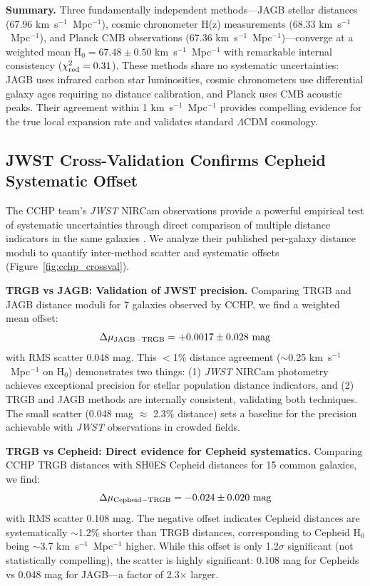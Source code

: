 \documentclass[twocolumn, linenumbers]{aastex701}
\begin{document}
\textbf{Summary.} Three fundamentally independent methods---JAGB stellar distances (67.96 km~s$^{-1}$~Mpc$^{-1}$), cosmic chronometer H(z) measurements (68.33 km~s$^{-1}$~Mpc$^{-1}$), and Planck CMB observations (67.36 km~s$^{-1}$~Mpc$^{-1}$)---converge at a weighted mean H$_0 = 67.48 \pm 0.50$ km~s$^{-1}$~Mpc$^{-1}$ with remarkable internal consistency ($\chi^2_{\rm red} = 0.31$). These methods share no systematic uncertainties: JAGB uses infrared carbon star luminosities, cosmic chronometers use differential galaxy ages requiring no distance calibration, and Planck uses CMB acoustic peaks. Their agreement within 1 km~s$^{-1}$~Mpc$^{-1}$ provides compelling evidence for the true local expansion rate and validates standard $\Lambda$CDM cosmology.

\subsection{JWST Cross-Validation Confirms Cepheid Systematic Offset}
\label{sec:results_jwst}

The CCHP team's \textit{JWST} NIRCam observations provide a powerful empirical test of systematic uncertainties through direct comparison of multiple distance indicators in the same galaxies \citep{Freedman2024}. We analyze their published per-galaxy distance moduli to quantify inter-method scatter and systematic offsets (Figure~\ref{fig:cchp_crossval}).

\textbf{TRGB vs JAGB: Validation of JWST precision.} Comparing TRGB and JAGB distance moduli for 7 galaxies observed by CCHP, we find a weighted mean offset:
\begin{equation}
\Delta\mu_{\rm JAGB-TRGB} = +0.0017 \pm 0.028~{\rm mag}
\end{equation}
with RMS scatter 0.048 mag. This $<$1\% distance agreement ($\sim$0.25 km~s$^{-1}$~Mpc$^{-1}$ on H$_0$) demonstrates two things: (1) \textit{JWST} NIRCam photometry achieves exceptional precision for stellar population distance indicators, and (2) TRGB and JAGB methods are internally consistent, validating both techniques. The small scatter (0.048 mag $\approx$ 2.3\% distance) sets a baseline for the precision achievable with \textit{JWST} observations in crowded fields.

\textbf{TRGB vs Cepheid: Direct evidence for Cepheid systematics.} Comparing CCHP TRGB distances with SH0ES Cepheid distances for 15 common galaxies, we find:
\begin{equation}
\Delta\mu_{\rm Cepheid-TRGB} = -0.024 \pm 0.020~{\rm mag}
\end{equation}
with RMS scatter 0.108 mag. The negative offset indicates Cepheid distances are systematically $\sim$1.2\% shorter than TRGB distances, corresponding to Cepheid H$_0$ being $\sim$3.7 km~s$^{-1}$~Mpc$^{-1}$ higher. While this offset is only 1.2$\sigma$ significant (not statistically compelling), the scatter is highly significant: 0.108 mag for Cepheids vs 0.048 mag for JAGB---a factor of 2.3$\times$ larger.
\end{document}

